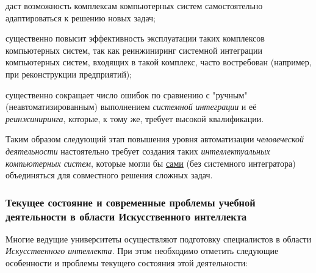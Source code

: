 \begin{textitemize}
	\item
	даст возможность комплексам компьютерных систем самостоятельно адаптироваться к решению новых задач;
	\item
	существенно повысит эффективность эксплуатации таких комплексов компьютерных систем, так как реинжиниринг системной интеграции компьютерных систем, входящих в такой комплекс, часто востребован (например, при реконструкции предприятий);
	\item
	существенно сокращает число ошибок по сравнению с "ручным"{} (неавтоматизированным) выполнением \textit{системной} \textit{интеграции} и её \textit{реинжиниринга}, которые, к тому же, требует высокой квалификации.
\end{textitemize}

Таким образом следующий этап повышения уровня автоматизации \textit{человеческой деятельности} настоятельно требует создания таких \textit{интеллектуальных компьютерных систем}, которые могли бы \underline{сами} (без системного интегратора) объединяться для совместного решения сложных задач.

\subsubsection{Текущее состояние и современные проблемы учебной деятельности в области Искусственного интеллекта}

Многие ведущие университеты осуществляют подготовку специалистов в области \textit{Искусственного интеллекта}. При этом необходимо отметить следующие особенности и проблемы текущего состояния этой деятельности:

